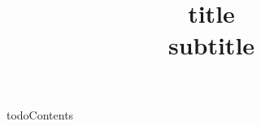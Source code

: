 \documentclass{article}
\title{
  {{title}}\\\large{
    {{subtitle}}
  }
}
\begin{document}
\maketitle


{{{todoContents}}}

\end{document}

